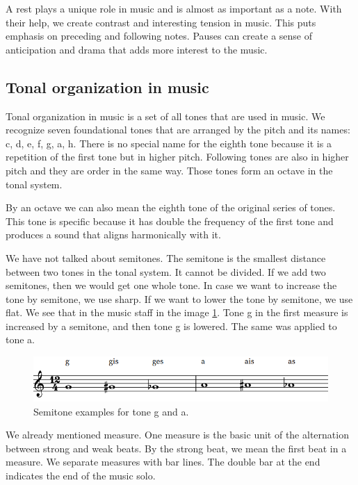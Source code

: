 A rest plays a unique role in music and is almost as important as a note. With their help, we create contrast and interesting tension in music. This puts emphasis on preceding and following notes. Pauses can create a sense of anticipation and drama that adds more interest to the music.

\subsection*{Tonal organization in music}
Tonal organization in music is a set of all tones that are used in music. We recognize seven foundational tones that are arranged by the pitch and its names: c, d, e, f, g, a, h. There is no special name for the eighth tone because it is a repetition of the first tone but in higher pitch. Following tones are also in higher pitch and they are order in the same way. Those tones form an octave in the tonal system.

By an octave we can also mean the eighth tone of the original series of tones. This tone is specific because it has double the frequency of the first tone and produces a sound that aligns harmonically with it.

We have not talked about semitones. The semitone is the smallest distance between two tones in the tonal system. It cannot be divided. If we add two semitones, then we would get one whole tone. In case we want to increase the tone by semitone, we use sharp. If we want to lower the tone by semitone, we use flat. We see that in the music staff in the image \ref{fig:semitones}. Tone g in the first measure is increased by a semitone, and then tone g is lowered. The same was applied to tone a.

\begin{figure}[H]
    \centering
    \includegraphics[scale=0.55]{obrazky-figures/semitones.png}
    \caption{Semitone examples for tone g and a.}
    \label{fig:semitones}
\end{figure}

We already mentioned measure. One measure is the basic unit of the alternation between strong and weak beats. By the strong beat, we mean the first beat in a measure. We separate measures with bar lines. The double bar at the end indicates the end of the music solo.

